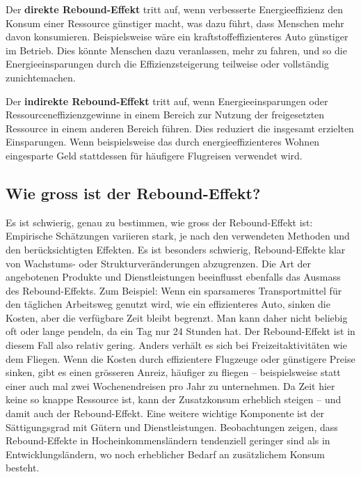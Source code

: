 \documentclass[
  nswissgerman,
  a4paper,
  DIV=11,
  numbers=noendperiod,
  oneside,
  openany]{scrreprt}
\begin{document}
\begin{tcolorbox}[enhanced jigsaw, arc=.35mm, bottomrule=.15mm, bottomtitle=1mm, breakable, colback=white, colbacktitle=quarto-callout-note-color!10!white, colframe=quarto-callout-note-color-frame, coltitle=black, left=2mm, leftrule=.75mm, opacityback=0, opacitybacktitle=0.6, rightrule=.15mm, title={Rebound-Effekte}, titlerule=0mm, toprule=.15mm, toptitle=1mm]

Der \textbf{direkte Rebound-Effekt} tritt auf, wenn verbesserte
Energieeffizienz den Konsum einer Ressource günstiger macht, was dazu
führt, dass Menschen mehr davon konsumieren. Beispielsweise wäre ein
kraftstoffeffizienteres Auto günstiger im Betrieb. Dies könnte Menschen
dazu veranlassen, mehr zu fahren, und so die Energieeinsparungen durch
die Effizienzsteigerung teilweise oder vollständig zunichtemachen.

Der \textbf{indirekte Rebound-Effekt} tritt auf, wenn
Energieeinsparungen oder Ressourceneffizienzgewinne in einem Bereich zur
Nutzung der freigesetzten Ressource in einem anderen Bereich führen.
Dies reduziert die insgesamt erzielten Einsparungen. Wenn beispielsweise
das durch energieeffizienteres Wohnen eingesparte Geld stattdessen für
häufigere Flugreisen verwendet wird.

\end{tcolorbox}

\subsection{Wie gross ist der
Rebound-Effekt?}\label{wie-gross-ist-der-rebound-effekt}

Es ist schwierig, genau zu bestimmen, wie gross der Rebound-Effekt ist:
Empirische Schätzungen variieren stark, je nach den verwendeten Methoden
und den berücksichtigten Effekten. Es ist besonders schwierig,
Rebound-Effekte klar von Wachstums- oder Strukturveränderungen
abzugrenzen. Die Art der angebotenen Produkte und Dienstleistungen
beeinflusst ebenfalls das Ausmass des Rebound-Effekts. Zum Beispiel:
Wenn ein sparsameres Transportmittel für den täglichen Arbeitsweg
genutzt wird, wie ein effizienteres Auto, sinken die Kosten, aber die
verfügbare Zeit bleibt begrenzt. Man kann daher nicht beliebig oft oder
lange pendeln, da ein Tag nur 24 Stunden hat. Der Rebound-Effekt ist in
diesem Fall also relativ gering. Anders verhält es sich bei
Freizeitaktivitäten wie dem Fliegen. Wenn die Kosten durch effizientere
Flugzeuge oder günstigere Preise sinken, gibt es einen grösseren Anreiz,
häufiger zu fliegen -- beispielsweise statt einer auch mal zwei
Wochenendreisen pro Jahr zu unternehmen. Da Zeit hier keine so knappe
Ressource ist, kann der Zusatzkonsum erheblich steigen -- und damit auch
der Rebound-Effekt. Eine weitere wichtige Komponente ist der
Sättigungsgrad mit Gütern und Dienstleistungen. Beobachtungen zeigen,
dass Rebound-Effekte in Hocheinkommensländern tendenziell geringer sind
als in Entwicklungsländern, wo noch erheblicher Bedarf an zusätzlichem
Konsum besteht.
\end{document}
